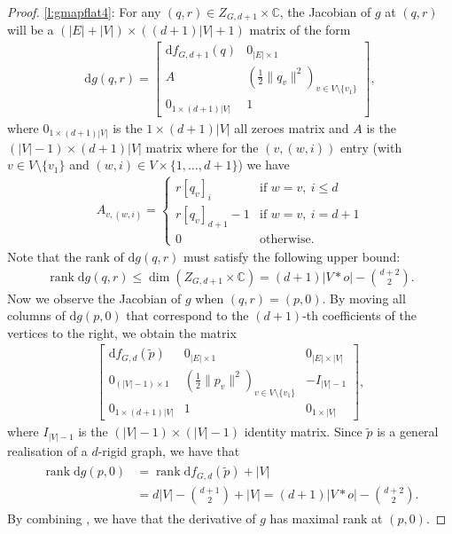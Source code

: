 \documentclass[ALCO]{cedram}
\DeclareMathOperator{\rank}{rank}
\newcommand{\diff}{\mathrm{d}}
\begin{document}
\begin{proof}
	\ref{l:gmapflat4}:
	For any $(q,r) \in Z_{G,d+1} \times \mathbb{C}$,
	the Jacobian of $g$ at $(q,r)$ will be a $(|E| + |V|) \times ((d+1)|V| + 1)$ matrix of the form
	\begin{align*}
		\diff g(q,r) =		
		\begin{bmatrix}
			\diff f_{G,d+1}(q) & 0_{|E| \times 1} \\
			A & \left(\frac{1}{2}\|q_v\|^2 \right)_{v \in V \setminus \{v_1\}} \\
			0_{1\times (d+1)|V|} & 1
		\end{bmatrix},
	\end{align*}
	where $0_{1 \times (d+1)|V|}$ is the $1 \times (d+1)|V|$ all zeroes matrix and $A$ is the $(|V|-1) \times (d+1)|V|$ matrix where for the $(v,(w,i))$ entry (with $v \in V \setminus \{v_1\}$ and $(w,i) \in V \times \{1,\ldots, d+1\}$) we have
	\begin{align*}
		A_{v, (w,i)} =
		\begin{cases}
			r [q_v]_i &\text{if } w = v, ~ i \leq d\\
			r[q_v]_{d+1} - 1 &\text{if } w = v, ~ i =d+1\\
			0 &\text{otherwise.}
		\end{cases}
	\end{align*}
	Note that the rank of $\diff g(q,r)$ must satisfy the following upper bound:
	\begin{align}\label{eq1:gmapflat}
		\rank \diff g(q,r) \leq \dim (Z_{G,d+1} \times \mathbb{C}) = (d+1)|V*o| - \binom{d+2}{2}.
	\end{align}
	Now we observe the Jacobian of $g$ when $(q,r) = (p,0)$.
	By moving all columns of $\diff g(p,0)$ that correspond to the $(d+1)$-th coefficients of the vertices to the right,
	we obtain the matrix
	\begin{align}\label{eq1.5:gmapflat}
		\begin{bmatrix}
			\diff f_{G,d}(\tilde{p}) & 0_{|E| \times 1} &  0_{|E| \times |V|} \\
			0_{(|V|-1) \times 1} & (\frac{1}{2}\|p_v\|^2)_{v \in V \setminus \{v_1\}} & -  I_{|V|-1}\\
			0_{1\times (d+1)|V|} & 1 &   0_{1 \times |V|}
		\end{bmatrix},
	\end{align}
	where $I_{|V|-1}$ is the $(|V|-1) \times (|V|-1)$ identity matrix.
	Since $\tilde{p}$ is a general realisation of a $d$-rigid graph,
	we have that
	\begin{align}\label{eq2:gmapflat}
		\begin{aligned}
			\rank \diff g(p,0) &= \rank \diff f_{G,d}(\tilde{p}) + |V| \\
			&= d|V| - \binom{d+1}{2} + |V| = (d+1)|V*o| - \binom{d+2}{2}.
		\end{aligned}
	\end{align}
	By combining ,
	we have that the derivative of $g$ has maximal rank at $(p,0)$.
	

\end{proof}
\end{document}
